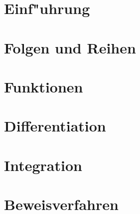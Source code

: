 \documentclass[12pt,a4paper,titlepage]{scrartcl}
\newcommand{\psection}[1]{\pagebreak\section{#1}}
\begin{document}


\psection{Einf"uhrung}


\psection{Folgen und Reihen}


\psection{Funktionen}


\psection{Differentiation}


\psection{Integration}


\psection{Beweisverfahren}

\end{document}
